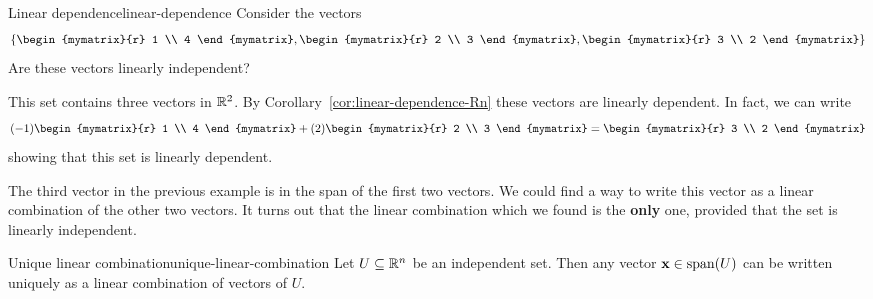 \begin{example}{Linear dependence}{linear-dependence}
Consider the vectors 
\[
\set{\begin{mymatrix}{r}
1 \\
4 
\end{mymatrix}, 
\begin{mymatrix}{r}
2 \\
3
\end{mymatrix}, 
\begin{mymatrix}{r}
3 \\
2
\end{mymatrix} }
\]
Are these vectors linearly independent?
\end{example}

\begin{solution}
This set contains three vectors in $\mathbb{R}^2$. By Corollary~\ref{cor:linear-dependence-Rn} these vectors are linearly dependent.
In fact, we can write
\[
(-1) \begin{mymatrix}{r}
1 \\
4 
\end{mymatrix} + (2) 
\begin{mymatrix}{r}
2 \\
3
\end{mymatrix} = 
\begin{mymatrix}{r}
3 \\
2
\end{mymatrix}
\]
showing that this set is linearly dependent. 
\end{solution}

The third vector in the previous example is in the span of the first two vectors. We could find a way to write this vector as a linear combination of the other two vectors. It turns out that the linear combination which we found is the \textbf{only} one, provided that the set is linearly independent. 

\begin{theorem}{Unique linear combination}{unique-linear-combination}
Let $U \subseteq\mathbb{R}^n$ be an independent set.
Then any vector $\vect{x}\in\sspan(U)$ can be written uniquely as a linear combination of vectors of $U$.
\end{theorem}

